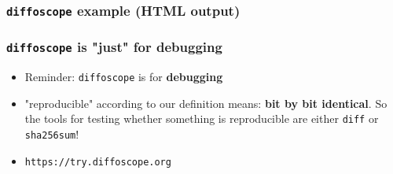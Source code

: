 \documentclass[14pt,aspectratio=169]{beamer}
\newif\ifplacelogo
\begin{document}
{\begin{frame}
 \frametitle{\texttt{diffoscope} example (HTML output)}
\end{frame}


\begin{frame}
 \frametitle{\texttt{diffoscope} is "just" for debugging}

 \begin{itemize}
  \item Reminder: \texttt{diffoscope} is for \textbf{debugging}
  \item "reproducible" according to our definition means: \textbf{bit by bit
  identical}. So the tools for testing whether something is reproducible are
  either \texttt{diff} or \texttt{sha256sum}!
  \item<2> \texttt{https://try.diffoscope.org}
 \end{itemize}
\end{frame}

}



\placelogofalse
\end{document}
